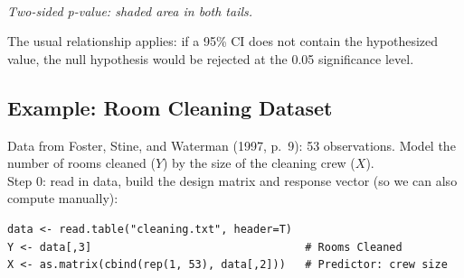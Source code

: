 \begin{center}
\\[2pt] \textit{\small Two-sided p-value: shaded area in both tails.}
\end{center}

\begin{remark}
    The usual relationship applies: if a 95\% CI does not contain the hypothesized
    value, the null hypothesis would be rejected at the 0.05 significance level.
\end{remark}

\subsection{Example: Room Cleaning Dataset}

\begin{example}[Setup]
    Data from Foster, Stine, and Waterman (1997, p.\ 9): 53 observations. Model the
    number of rooms cleaned ($Y$) by the size of the cleaning crew ($X$).
    \\ Step 0: read in data, build the design matrix and response vector (so we can
    also compute manually):
\begin{verbatim}
data <- read.table("cleaning.txt", header=T)
Y <- data[,3]                                 # Rooms Cleaned
X <- as.matrix(cbind(rep(1, 53), data[,2]))   # Predictor: crew size
\end{verbatim}
\end{example}

